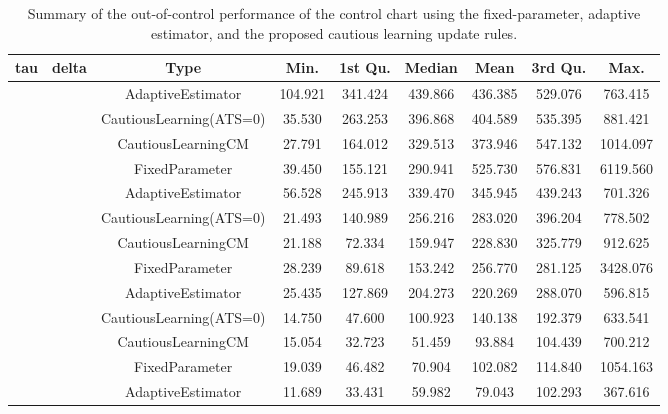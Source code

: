 \begin{table}[!h]

\caption{Summary of the out-of-control performance of the control chart using the fixed-parameter, adaptive estimator, and the proposed cautious learning update rules.}
\centering
\begin{tabular}[t]{ccccccccc}
\toprule
tau & delta & Type & Min. & 1st Qu. & Median & Mean & 3rd Qu. & Max.\\
\midrule
 &  & AdaptiveEstimator & 104.921 & 341.424 & 439.866 & 436.385 & 529.076 & 763.415\\

 &  & CautiousLearning(ATS=0) & 35.530 & 263.253 & 396.868 & 404.589 & 535.395 & 881.421\\

 &  & CautiousLearningCM & 27.791 & 164.012 & 329.513 & 373.946 & 547.132 & 1014.097\\

 & \multirow[t]{-4}{*}{\centering\arraybackslash 0.25} & FixedParameter & 39.450 & 155.121 & 290.941 & 525.730 & 576.831 & 6119.560\\
\cmidrule{2-9}
 &  & AdaptiveEstimator & 56.528 & 245.913 & 339.470 & 345.945 & 439.243 & 701.326\\

 &  & CautiousLearning(ATS=0) & 21.493 & 140.989 & 256.216 & 283.020 & 396.204 & 778.502\\

 &  & CautiousLearningCM & 21.188 & 72.334 & 159.947 & 228.830 & 325.779 & 912.625\\

 & \multirow[t]{-4}{*}{\centering\arraybackslash 0.35} & FixedParameter & 28.239 & 89.618 & 153.242 & 256.770 & 281.125 & 3428.076\\
\cmidrule{2-9}
 &  & AdaptiveEstimator & 25.435 & 127.869 & 204.273 & 220.269 & 288.070 & 596.815\\

 &  & CautiousLearning(ATS=0) & 14.750 & 47.600 & 100.923 & 140.138 & 192.379 & 633.541\\

 &  & CautiousLearningCM & 15.054 & 32.723 & 51.459 & 93.884 & 104.439 & 700.212\\

 & \multirow[t]{-4}{*}{\centering\arraybackslash 0.50} & FixedParameter & 19.039 & 46.482 & 70.904 & 102.082 & 114.840 & 1054.163\\
\cmidrule{2-9}
 &  & AdaptiveEstimator & 11.689 & 33.431 & 59.982 & 79.043 & 102.293 & 367.616\\


\end{tabular}
\end{table}
